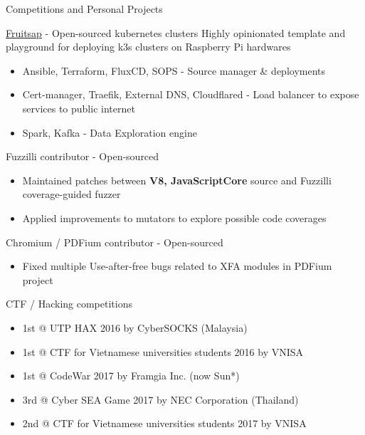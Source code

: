 \documentclass{article}
\newlength{\tabin}
\newlength{\secsep}
\newcommand{\lineunder}{\vspace*{-8pt} \\ \hspace*{-6pt} \hrulefill \\ \vspace*{-15pt}}
\newenvironment{tabbedsection}[1]{
  \begin{list}{}{
      \setlength{\itemsep}{0pt}
      \setlength{\labelsep}{0pt}
      \setlength{\labelwidth}{0pt}
      \setlength{\leftmargin}{\tabin}
      \setlength{\rightmargin}{\tabin}
      \setlength{\listparindent}{0pt}
      \setlength{\parsep}{0pt}
      \setlength{\parskip}{0pt}
      \setlength{\partopsep}{0pt}
      \setlength{\topsep}{#1}
    }
  \item[]
}{\end{list}}
\newenvironment{resume_section}[1]{
  \filbreak
  \vspace{2\secsep}
  \textsc{\large#1}
  \lineunder
  \begin{tabbedsection}{\secsep}
}{\end{tabbedsection}}
\newenvironment{resume_subsection}[2][]{
  \textbf{#2} \hfill {\footnotesize #1} \hspace{2em}
  \begin{tabbedsection}{0.5\secsep}
}{\end{tabbedsection}}
\newenvironment{subitems}{
  \renewcommand{\labelitemi}{-}
  \begin{itemize}
      \setlength{\labelsep}{1em}
}{\end{itemize}}
\begin{document}
  \begin{resume_section}{Competitions and Personal Projects}

    \begin{resume_subsection}[2022 - Present]{\href{https://github.com/minhtt159/fruitsap}{Fruitsap} - Open-sourced kubernetes clusters}
      Highly opinionated template and playground for deploying k3s clusters on Raspberry Pi hardwares
      \begin{subitems}
        \item Ansible, Terraform, FluxCD, SOPS - Source manager \& deployments
        \item Cert-manager, Traefik, External DNS, Cloudflared - Load balancer to expose services to public internet
        \item Spark, Kafka - Data Exploration engine
      \end{subitems}
    \end{resume_subsection}

    \begin{resume_subsection}[2020]{Fuzzilli contributor - Open-sourced}
      \begin{subitems}
        \item Maintained patches between \textbf{V8, JavaScriptCore} source and Fuzzilli coverage-guided fuzzer
        \item Applied improvements to mutators to explore possible code coverages
      \end{subitems}
    \end{resume_subsection}
    
    \begin{resume_subsection}[2019]{Chromium / PDFium contributor - Open-sourced}
      \begin{subitems}
      \item Fixed multiple Use-after-free bugs related to XFA modules in PDFium project 
      \end{subitems}
    \end{resume_subsection}

    \begin{resume_subsection}{CTF / Hacking competitions}
      \begin{subitems}
        \item 1st @ UTP HAX 2016 by CyberSOCKS (Malaysia)
        \item 1st @ CTF for Vietnamese universities students 2016 by VNISA 
        \item 1st @ CodeWar 2017 by Framgia Inc. (now Sun*)
        \item 3rd @ Cyber SEA Game 2017 by NEC Corporation (Thailand)
        \item 2nd @ CTF for Vietnamese universities students 2017 by VNISA 
      \end{subitems}
    \end{resume_subsection}

  \end{resume_section}
\end{document}
